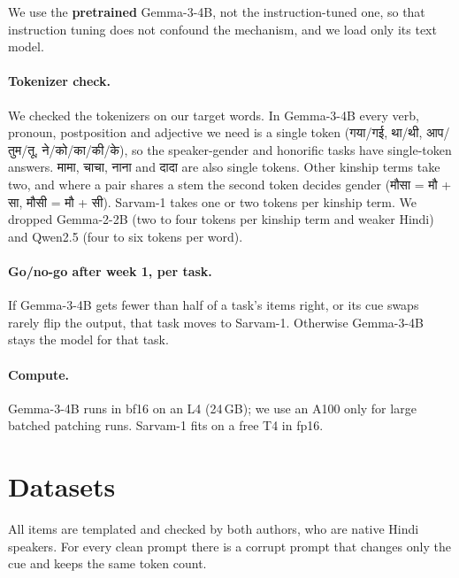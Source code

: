 \documentclass[11pt,a4paper]{article}
\newcommand{\hi}[1]{{\devfont #1}}
\begin{document}
We use the \textbf{pretrained} Gemma-3-4B, not the instruction-tuned one, so that instruction tuning does not confound the mechanism, and we load only its text model.

\paragraph{Tokenizer check.} We checked the tokenizers on our target words. In Gemma-3-4B every verb, pronoun, postposition and adjective we need is a single token (\hi{गया/गई}, \hi{था/थी}, \hi{आप/तुम/तू}, \hi{ने/को/का/की/के}), so the speaker-gender and honorific tasks have single-token answers. \hi{मामा}, \hi{चाचा}, \hi{नाना} and \hi{दादा} are also single tokens. Other kinship terms take two, and where a pair shares a stem the second token decides gender (\hi{मौसा} = \hi{मौ} + \hi{सा}, \hi{मौसी} = \hi{मौ} + \hi{सी}). Sarvam-1 takes one or two tokens per kinship term. We dropped Gemma-2-2B (two to four tokens per kinship term and weaker Hindi) and Qwen2.5 (four to six tokens per word).

\paragraph{Go/no-go after week 1, per task.} If Gemma-3-4B gets fewer than half of a task's items right, or its cue swaps rarely flip the output, that task moves to Sarvam-1. Otherwise Gemma-3-4B stays the model for that task.

\paragraph{Compute.} Gemma-3-4B runs in bf16 on an L4 (24\,GB); we use an A100 only for large batched patching runs. Sarvam-1 fits on a free T4 in fp16.

\section{Datasets}

All items are templated and checked by both authors, who are native Hindi speakers. For every clean prompt there is a corrupt prompt that changes only the cue and keeps the same token count.
\end{document}
